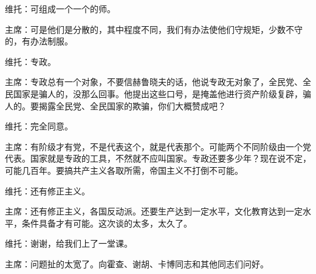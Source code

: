 维托：可组成一个一个的师。

主席：可是他们是分散的，其中程度不同，我们有办法使他们守规矩，少数不守的，有办法制服。

维托：专政。

主席：专政总有一个对象，不要信赫鲁晓夫的话，他说专政无对象了，全民党、全民国家是骗人的，没那么回事。他提出这些口号，是掩盖他进行资产阶级复辟，骗人的。要揭露全民党、全民国家的欺骗，你们大概赞成吧？

维托：完全同意。

主席：有阶级才有党，不是代表这个，就是代表那个。可能两个不同阶级由一个党代表。国家就是专政的工具，不然就不应叫国家。专政还要多少年？现在说不定，可能几百年。要搞共产主义各取所需，帝国主义不打倒不可能。

维托：还有修正主义。

主席：还有修正主义，各国反动派。还要生产达到一定水平，文化教育达到一定水平，条件具备才有可能。这次谈的太多，太久了。

维托：谢谢，给我们上了一堂课。

主席：问题扯的太宽了。向霍查、谢胡、卡博同志和其他同志们问好。


